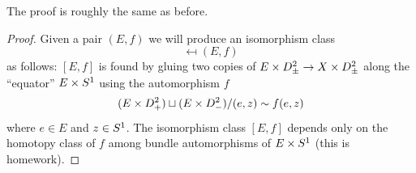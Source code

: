 The proof is roughly the same as before.

\begin{proof}
Given a pair $(E,f)$ we will produce an isomorphism class
\begin{equation}
[E,f]\mapsfrom(E,f)
\end{equation}
as follows:
$[E,f]$ is found by gluing two copies of $E\times D^{2}_{\pm}\to X\times D^{2}_{\pm}$
along the ``equator'' $E\times S^{1}$ using the automorphism $f$
\begin{equation}
(E\times D^{2}_{+})\sqcup(E\times D^{2}_{-})/(e,z)\sim f(e,z)
\end{equation}
where $e\in E$ and $z\in S^{1}$. The isomorphism class $[E,f]$
depends only on the homotopy class of $f$ among bundle automorphisms
of $E\times S^{1}$ (this is homework).


\end{proof}
